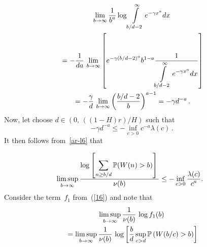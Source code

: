 \begin{multicols}{2}
\noindent
\begin{multline*}
\lim\limits_{b \to \infty} \displaystyle\frac{\displaystyle 1\mathstrut}{\displaystyle b^a\mathstrut}\log \int\limits_{b/d-2}^\infty e^{-\gamma x^a}dx\\
{} =-\displaystyle\frac{\displaystyle 1\mathstrut}{\displaystyle da\mathstrut}\,\lim\limits_{b \to \infty} \left
[e^{-\gamma(b/d-2)^a}b^{1-a} \displaystyle\frac{\displaystyle 1\mathstrut}{\displaystyle \int\limits_{b/d-2}^\infty
e^{-\gamma x^a}dx\mathstrut}\right]\\
{}=-\displaystyle\frac{\displaystyle \gamma\mathstrut}{\displaystyle d\mathstrut}\,\lim\limits_{b \to \infty}\left(
\displaystyle\frac{\displaystyle b/d-2\mathstrut}{\displaystyle b\mathstrut} \right)^{a-1} =-\gamma d^{-a}\,.
\end{multline*}
 Now, let  choose  $d \in \left(0,\,((1-H)r)/H \right)$ such  that
$$
-\gamma d^{-a}\le -\inf\limits_{c>0} c^{-a}\lambda(c)\,.
$$
It then follows from~\eqref{ar-l6} that

\noindent
\begin{equation}
\hspace*{-3mm}\limsup\limits_{b \to \infty} \fr{\log\left[ \sum\limits_{n \geq b/d} \P
(W(n)>b)\right]}{\nu(b)}  \leq -\inf\limits_{c>0}\fr{\lambda(c)}{c^{a}}.\!\!
\label{asymp-l8}
\end{equation}
Consider the term~$f_1$ from~(\ref{16}) and note that
\begin{multline*}
\limsup\limits_{b \to \infty}\displaystyle\frac{\displaystyle 1\mathstrut}{\displaystyle \nu(b)\mathstrut}\,\log f_1(b)\\
{}=
\limsup\limits_{b \to \infty}\displaystyle\frac{\displaystyle 1\mathstrut}{\displaystyle \nu(b)\mathstrut}\,\log \left[
\displaystyle\frac{\displaystyle b\mathstrut}{\displaystyle d\mathstrut}\sup\limits_{c>d} \mathbb{P}
\left(W(b/c)>b\right) \right]
\end{multline*}



\end{multicols}
